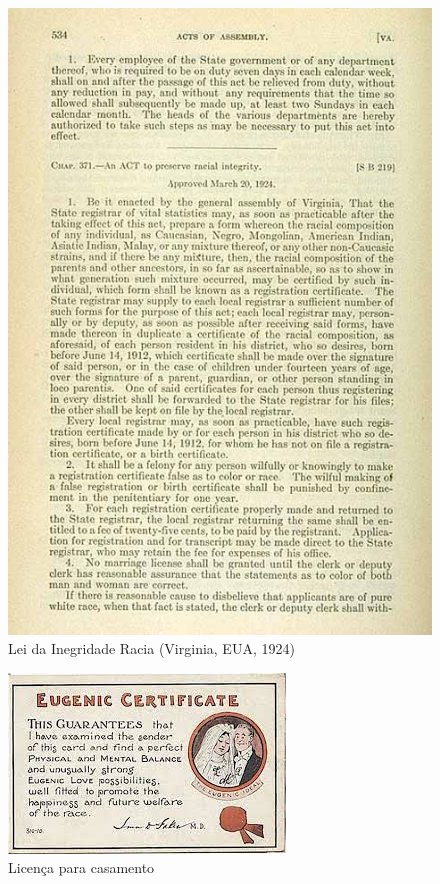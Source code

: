 \documentclass[
]{book}
\begin{document}
\begin{figure}

{\centering \includegraphics[width=0.75\linewidth]{images1/VA_racial_integrity_act2} 

}

\caption{Lei da Inegridade Racia (Virginia, EUA, 1924)}\label{fig:unnamed-chunk-19}
\end{figure}

\hfill\break

\begin{figure}

{\centering \includegraphics[width=0.75\linewidth]{images1/choosing_love_over_eugenics} 

}

\caption{Licença para casamento}\label{fig:unnamed-chunk-20}
\end{figure}
\end{document}
